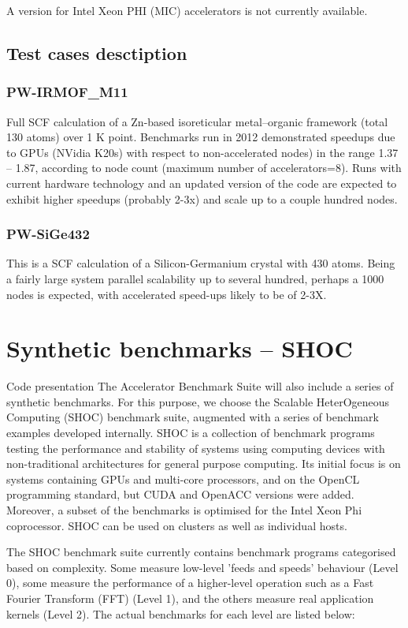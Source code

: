 A version for Intel Xeon PHI (MIC) accelerators is not currently available.

\subsection{Test cases desctiption}


\subsubsection{PW-IRMOF\_M11}
Full SCF calculation of a Zn-based isoreticular metal–organic framework (total 130 atoms) over 1 K point.  Benchmarks run in 2012 demonstrated speedups due to GPUs (NVidia K20s) with respect to non-accelerated nodes) in the range 1.37 – 1.87, according to node count (maximum number of accelerators=8). Runs with current hardware technology and an updated version of the code are expected to exhibit higher speedups (probably 2-3x) and scale up to a couple hundred nodes.


\subsubsection{PW-SiGe432}
This is a SCF calculation of a Silicon-Germanium crystal with 430 atoms. Being a fairly large system parallel scalability up to several hundred, perhaps a 1000 nodes is expected, with accelerated speed-ups likely to be of 2-3X.

\section{Synthetic benchmarks -- SHOC}
Code presentation
The Accelerator Benchmark Suite will also include a series of synthetic benchmarks. For this purpose, we choose the Scalable HeterOgeneous Computing (SHOC) benchmark suite, augmented with a series of benchmark examples developed internally. SHOC is a collection of benchmark programs testing the performance and stability of systems using computing devices with non-traditional architectures for general purpose computing. Its initial focus is on systems containing GPUs and multi-core processors, and on the OpenCL programming standard, but CUDA and OpenACC versions were added. Moreover, a subset of the benchmarks is optimised for the Intel Xeon Phi coprocessor. SHOC can be used on clusters as well as individual hosts.

The SHOC benchmark suite currently contains benchmark programs categorised based on complexity.  Some measure low-level 'feeds and speeds' behaviour (Level 0), some measure the performance of a higher-level operation such as a Fast Fourier Transform (FFT) (Level 1), and the others measure real application kernels (Level 2). The actual benchmarks for each level are listed below:

